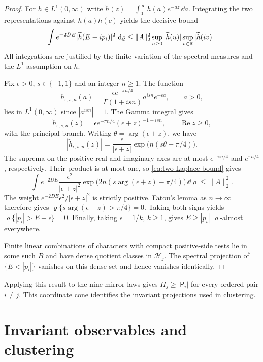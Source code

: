 \begin{proof}
For $h\in L^1(0,\infty)$ write
$\widetilde h(z)=\int_0^\infty h(a)e^{-az}\,\dd a$.
Integrating the two representations against
$h(a)\overline{h(c)}$ yields the decisive bound
\begin{equation}\label{eq:two-Laplace-bound}
 \int e^{-2DE}|\widetilde h(E-ip_i)|^2\,\,\mathrm d\varrho
 \le\|A\|_2^2
 \sup_{u\ge0}|\widetilde h(u)|
 \sup_{v\in\mathbb R}|\widetilde h(iv)|.
\end{equation}
All integrations are justified by the finite variation of the
spectral measures and the $L^1$ assumption on $h$.

Fix $\epsilon>0$, $s\in\{-1,1\}$ and an integer $n\ge1$. The function
\[
 h_{\epsilon,s,n}(a)
 =\frac{\epsilon e^{-\pi n/4}}{\Gamma(1+isn)}
   a^{isn}e^{-\epsilon a},\qquad a>0,
\]
lies in $L^1(0,\infty)$ since $|a^{isn}|=1$. The Gamma integral gives
\begin{equation}\label{eq:cone-Laplace-tests}
 \widetilde h_{\epsilon,s,n}(z)
 =\epsilon e^{-\pi n/4}(\epsilon+z)^{-1-isn},
 \qquad \operatorname{Re}z\ge0,
\end{equation}
with the principal branch. Writing $\theta=\arg(\epsilon+z)$, we have
\[
 |\widetilde h_{\epsilon,s,n}(z)|
 =\frac{\epsilon}{|\epsilon+z|}
   \exp\bigl(n(s\theta-\pi/4)\bigr).
\]
The suprema on the positive real and imaginary axes are at most
$e^{-\pi n/4}$ and $e^{\pi n/4}$, respectively. Their product is
at most one, so \eqref{eq:two-Laplace-bound} gives
\[
 \int e^{-2DE}\frac{\epsilon^2}{|\epsilon+z|^2}
   \exp\bigl(2n(s\arg(\epsilon+z)-\pi/4)\bigr)\,\dd\varrho
 \le\|A\|_2^2.
\]
The weight $e^{-2DE}\epsilon^2/|\epsilon+z|^2$ is strictly positive.
Fatou's lemma as $n\to\infty$ therefore gives
$\varrho\{s\arg(\epsilon+z)>\pi/4\}=0$.
Taking both signs yields $\varrho\{|p_i|>E+\epsilon\}=0$.
Finally, taking $\epsilon=1/k$, $k\ge1$, gives $E\ge|p_i|$
$\varrho$-almost everywhere.

Finite linear combinations of characters with compact positive-side
tests lie in some such $B$ and have dense quotient classes in
$\mathcal H_j$. The spectral projection of $\{E<|p_i|\}$
vanishes on this dense set and hence vanishes identically.
\end{proof}

Applying this result to the nine-mirror laws gives
$H_j\ge|\mathsf P_i|$ for every ordered pair $i\ne j$. This coordinate
cone identifies the invariant projections used in clustering.

\section{Invariant observables and clustering}
\label{subsec:invariant-reflection}

